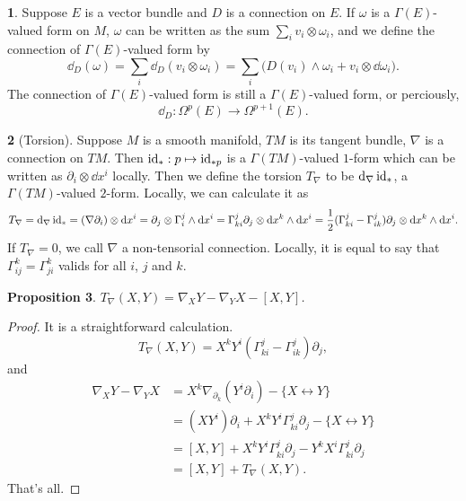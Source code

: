 \documentclass[11pt]{article}
\theoremstyle{definition}
\newtheorem{para}{}[part]
\theoremstyle{plain}
\newtheorem{pro}[para]{Proposition}
\begin{document}
\begin{para}
Suppose $E$ is a vector bundle and $D$ is a connection on $E$. If $\omega$ is a $\Gamma(E)$-valued form on $M$, $\omega$ can be written as the sum $\sum_i v_i\otimes \omega_i$, and we define the connection of $\Gamma(E)$-valued form by
\[
	\dd_D(\omega)=\sum_i \dd_D(v_i\otimes \omega_i)=\sum_i\bigl(D(v_i)\wedge \omega_i+v_i\otimes \dd\omega_i\bigr).
\]
The connection of $\Gamma(E)$-valued form is still a $\Gamma(E)$-valued form, or perciously, 
\[
	\dd_D:\Omega^p(E)\to \Omega^{p+1}(E).
\]
\end{para}

\begin{para}[Torsion]
Suppose $M$ is a smooth manifold, $TM$ is its tangent bundle, $\nabla$ is a connection on $TM$. Then $\operatorname{id}_* : p\mapsto \operatorname{id}_{*p}$ is a $\Gamma(TM)$-valued $1$-form which can be written as $\partial_i\otimes \dd x^i$ locally. Then we define the torsion $T_\nabla$ to be $\mathrm{d}_\nabla\operatorname{id}_*$, a $\Gamma(TM)$-valued $2$-form. Locally, we can calculate it as
\[
	T_\nabla=\mathrm{d}_\nabla\operatorname{id}_*=(\nabla\partial_i)\otimes \mathrm{d} x^i=\partial_j\otimes\Gamma_i^j\wedge \mathrm{d} x^i=\Gamma_{ki}^j\partial_j\otimes\mathrm{d} x^k\wedge \mathrm{d} x^i=\frac 1 2 (\Gamma_{ki}^j-\Gamma_{ik}^j)\partial_j\otimes\mathrm{d} x^k\wedge \mathrm{d} x^i.
\]
If $T_\nabla=0$, we call $\nabla$ a non-tensorial connection. Locally, it is equal to say that $\Gamma_{ij}^k=\Gamma_{ji}^k$ valids for all $i$, $j$ and $k$.
\end{para}

\begin{pro}
$T_\nabla(X,Y)=\nabla_X Y-\nabla_Y X-[X,Y]$.
\end{pro}

\begin{proof}
It is a straightforward calculation.
\[
	T_\nabla(X,Y)=X^k Y^i(\Gamma_{ki}^j-\Gamma_{ik}^j)\partial_j,
\]
and
\begin{align*}
	\nabla_X Y-\nabla_Y X&=X^k\nabla_{\partial_k}(Y^i\partial_i)-\{X\leftrightarrow Y\}\\
	&=(XY^i)\partial_i+X^kY^i\Gamma^j_{ki}\partial_j-\{X\leftrightarrow Y\}\\
	&=[X,Y]+X^kY^i\Gamma^j_{ki}\partial_j-Y^kX^i\Gamma^j_{ki}\partial_j\\
	&=[X,Y]+T_\nabla(X,Y).
\end{align*}
That's all.
\end{proof}
\end{document}
